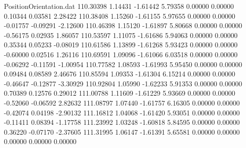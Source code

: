\begin{filecontents}{PositionOrientation.dat}
 110.30398    1.14431   -1.61442     5.79358    0.00000    0.00000    0.10344    0.03581    2.28422
 110.38408    1.15260   -1.61155     5.97655    0.00000    0.00000   -0.01757   -0.09291   -2.12600
 110.46398    1.15120   -1.61897     5.80668    0.00000    0.00000   -0.56175    0.02935    1.86057
 110.53597    1.11075   -1.61686     5.94063    0.00000    0.00000    0.35344    0.05233   -0.08019
 110.61586    1.13899   -1.61268     5.93423    0.00000    0.00000   -0.60000    0.02516    1.26116
 110.69591    1.09096   -1.61066     6.03518    0.00000    0.00000   -0.06292   -0.11591   -1.00954
 110.77582    1.08593   -1.61993     5.95450    0.00000    0.00000    0.09484    0.08589    2.46676
 110.85594    1.09353   -1.61304     6.15214    0.00000    0.00000   -0.46647   -0.12877   -3.30929
 110.92804    1.05990   -1.62233     5.91353    0.00000    0.00000    0.70389    0.12576    0.29012
 111.00788    1.11609   -1.61229     5.93669    0.00000    0.00000   -0.52060   -0.06592    2.82632
 111.08797    1.07440   -1.61757     6.16305    0.00000    0.00000   -0.42074    0.04198   -2.90132
 111.16812    1.04068   -1.61420     5.93051    0.00000    0.00000   -0.11411    0.08394   -1.17758
 111.23992    1.03248   -1.60818     5.84595    0.00000    0.00000    0.36220   -0.07170   -2.37605
 111.31995    1.06147   -1.61391     5.65581    0.00000    0.00000    0.00000    0.00000    0.00000
\end{filecontents}
